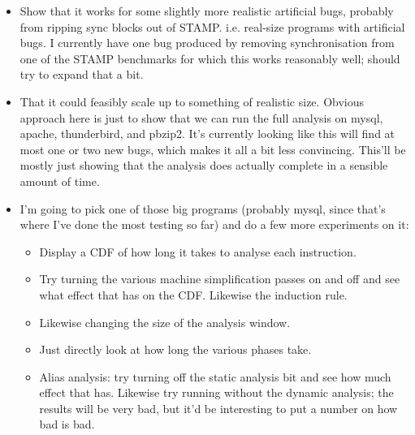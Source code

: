 \begin{itemize}
\item Show that it works for some slightly more realistic artificial
  bugs, probably from ripping sync blocks out of STAMP.
  i.e. real-size programs with artificial bugs.  I currently have one
  bug produced by removing synchronisation from one of the STAMP
  benchmarks for which this works reasonably well; should try to
  expand that a bit.

\item That it could feasibly scale up to something of realistic size.
  Obvious approach here is just to show that we can run the full
  analysis on mysql, apache, thunderbird, and pbzip2.  It's currently
  looking like this will find at most one or two new bugs, which makes
  it all a bit less convincing.  This'll be mostly just showing that
  the analysis does actually complete in a sensible amount of time.
\item I'm going to pick one of those big programs (probably mysql,
  since that's where I've done the most testing so far) and do a few
  more experiments on it:

  \begin{itemize}
  \item Display a CDF of how long it takes to analyse each instruction.
  \item Try turning the various machine simplification passes on and
    off and see what effect that has on the CDF.  Likewise the
    induction rule.
  \item Likewise changing the size of the analysis window.
  \item Just directly look at how long the various phases take.
  \item Alias analysis: try turning off the static analysis bit and
    see how much effect that has.  Likewise try running without the
    dynamic analysis; the results will be very bad, but it'd be
    interesting to put a number on how bad is bad.
  \end{itemize}


\end{itemize}
